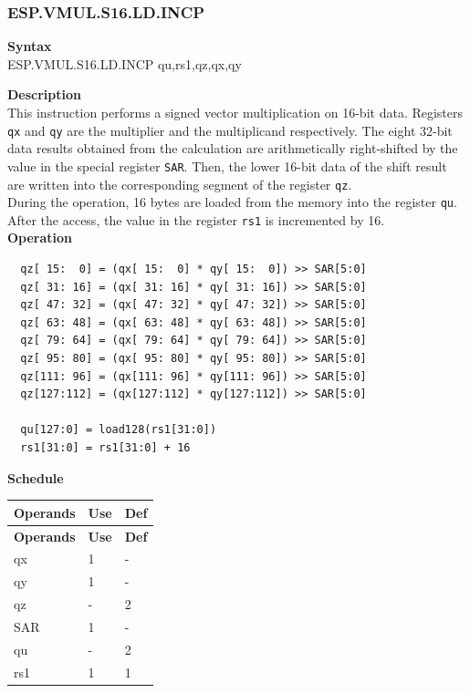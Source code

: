 \newpage
\subsubsection{ESP.VMUL.S16.LD.INCP}\label{instruction:ESPVMULS16LDINCP}
\textbf{Syntax}\\
ESP.VMUL.S16.LD.INCP qu,rs1,qz,qx,qy

\textbf{Description}\\
This instruction performs a signed vector multiplication on 16-bit data. Registers \lstinline{qx} and \lstinline{qy} are the multiplier and the multiplicand respectively. The eight 32-bit data results obtained from the calculation are arithmetically right-shifted by the value in the special register \lstinline{SAR}. Then, the lower 16-bit data of the shift result are written into the corresponding segment of the register \lstinline{qz}.\\
During the operation, 16 bytes are loaded from the memory into the register \lstinline{qu}. After the access, the value in the register \lstinline{rs1} is incremented by 16.\\
\textbf{Operation}
\begin{lstlisting}
  qz[ 15:  0] = (qx[ 15:  0] * qy[ 15:  0]) >> SAR[5:0]
  qz[ 31: 16] = (qx[ 31: 16] * qy[ 31: 16]) >> SAR[5:0]
  qz[ 47: 32] = (qx[ 47: 32] * qy[ 47: 32]) >> SAR[5:0]
  qz[ 63: 48] = (qx[ 63: 48] * qy[ 63: 48]) >> SAR[5:0]
  qz[ 79: 64] = (qx[ 79: 64] * qy[ 79: 64]) >> SAR[5:0]
  qz[ 95: 80] = (qx[ 95: 80] * qy[ 95: 80]) >> SAR[5:0]
  qz[111: 96] = (qx[111: 96] * qy[111: 96]) >> SAR[5:0]
  qz[127:112] = (qx[127:112] * qy[127:112]) >> SAR[5:0]

  qu[127:0] = load128(rs1[31:0])
  rs1[31:0] = rs1[31:0] + 16
\end{lstlisting}


\textbf{Schedule}\\
\begin{longtable}[c]{|l|l|l|}
    \hline
    \rowcolor{lightgray}
    \textbf{Operands} & \textbf{Use} & \textbf{Def} \\\hline
    \endfirsthead
    \hline
    \rowcolor{lightgray}
     \textbf{Operands} & \textbf{Use} & \textbf{Def} \\\hline
    \endhead
    \hline
    \endfoot

    qx & 1 & - \\\hline
  qy & 1 & - \\\hline
     qz & - & 2 \\\hline
    SAR & 1 & - \\\hline
    qu & - & 2 \\\hline
    rs1 & 1 & 1
\end{longtable}

